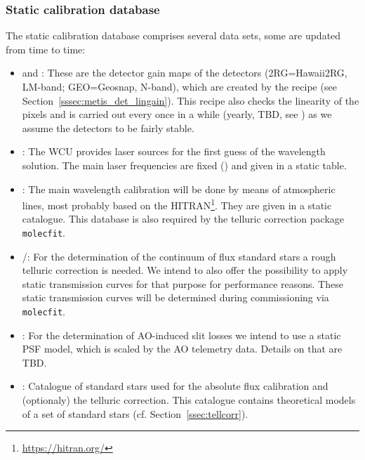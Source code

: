 \subsubsection{Static calibration database}\label{lss:static_calib}
The static calibration database comprises several data sets, some are updated from time to time:
\begin{itemize}
    \item \hyperref[dataitem:gain_map_lm]{} and \hyperref[dataitem:gain_map_n]{}: These are the detector gain maps of the detectors (2RG=Hawaii2RG, LM-band; GEO=Geosnap, N-band), which are created by the recipe \hyperref[sssec:metis_det_lingain]{} (see Section~\ref{sssec:metis_det_lingain}). This recipe also checks the linearity of the pixels and is carried out every once in a while (yearly, TBD, see \cite{METIS-calibration_plan}) as we assume the detectors to be fairly stable.
    \item \hyperref[dataitem:laser_tab]{}: The \ac{WCU} provides laser sources for the first guess of the wavelength solution. The main laser frequencies are fixed (\cite{METIS-calibration_plan}) and given in a static table.
    \item \hyperref[dataitem:atm_line_cat]{}: The main wavelength calibration will be done by means of atmospheric lines, most probably based on the \ac{HITRAN}\footnote{\url{https://hitran.org/}}. They are given in a static catalogue. This database is also required by the telluric correction package \texttt{molecfit}.
    \item \hyperref[dataitem:lm_synth_trans]{}/\hyperref[dataitem:n_synth_trans]{}: For the determination of the continuum of flux standard stars a rough telluric correction is needed. We intend to also offer the possibility to apply static transmission curves for that purpose for performance reasons. These static transmission curves will be determined during commissioning via \texttt{molecfit}.
    \item \hyperref[dataitem:ao_psf_model]{}: For the determination of \ac{AO}-induced slit losses we intend to use a static \ac{PSF} model, which is scaled by the \ac{AO} telemetry data. Details on that are TBD.
    \item \hyperref[dataitem:ref_std_cat]{}: Catalogue of standard stars used for the absolute flux calibration and (optionaly) the telluric correction. This catalogue contains theoretical models of a set of standard stars (cf. Section~\ref{ssec:tellcorr}). 

\end{itemize}
